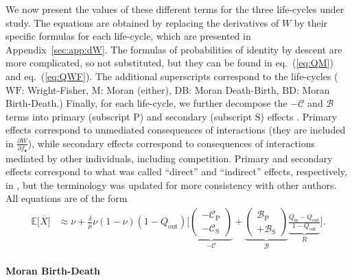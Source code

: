 \documentclass[11pt, letterpaper]{article}
\renewcommand{\eqref}[1]{\textup{{\normalfont eq.~(\ref{#1}}\normalfont)}}
\newcommand{\derivn}[2]{\frac{\partial #1}{\partial #2}}
\newcommand{\Esp}[1]{\mathbb{E}\big[ #1\big]}%
\newcommand{\appname}[0]{Appendix}
\newcommand{\Moran}{\textrm{M}}
\newcommand{\BD}{\textrm{BD}}
\newcommand{\DB}{\textrm{DB}}
\newcommand{\WF}{\textrm{WF}}
\newcommand{\mutbias}{\nu}
\newcommand{\inn}{\textrm{in}}
\newcommand{\out}{\textrm{out}}
\newcommand{\focal}{\bullet}
\newcommand{\prim}{\textrm{P}}
\newcommand{\secd}{\textrm{S}}
\newcommand{\selstr}{\delta}
\begin{document}
We now present the values of these different terms for the three life-cycles under study. The equations are obtained by replacing the derivatives of $W$ by their specific formulas for each life-cycle, which are presented in \appname~\ref{sec:app:dW}. The formulas of  probabilities of identity by descent are more complicated, so not substituted, but they can be found in \eqref{eq:QM} and \eqref{eq:QWF}. The additional superscripts correspond to the life-cycles ($\WF$: Wright-Fisher, $\Moran$: Moran (either), $\DB$: Moran Death-Birth, $\BD$: Moran Birth-Death.) Finally, for each life-cycle, we further decompose the $-\mathcal{C}$ and $\mathcal{B}$ terms into primary (subscript $\prim$) and secondary (subscript $\secd$) effects \citep{WestGardner2010}. Primary effects correspond to unmediated consequences of interactions (they are included in $\derivn{W}{f_{\focal}}$), while secondary effects correspond to consequences of interactions mediated by other individuals, including competition. Primary and secondary effects correspond to what was called ``direct'' and ``indirect'' effects, respectively, in \citet{DebarreHD2014, Debarre2017}, but the terminology was updated for more consistency with other authors. All equations are of the form
%
\begin{equation}\label{eq:EXgeneric}
\begin{split}
\Esp{\overline{X}} & \approx \mutbias + 
\frac{\selstr}{\mu}  \mutbias (1-\mutbias) (1 - Q_{\out}) 
 \Bigg[ \underbrace{ \begin{pmatrix}
 -\mathcal{C}_{\prim} \\
 -\mathcal{C}_{\secd} 
 \end{pmatrix}
}_{-\mathcal{C}} + \underbrace{ \begin{pmatrix}
\mathcal{B}_{\prim} \\
+ \mathcal{B}_{\secd} 
\end{pmatrix}
}_{\mathcal{B}} \underbrace{\frac{Q_{\inn} - Q_{\out}}{1 - Q_{\out}}}_{R} \Bigg].
\end{split}
\end{equation}

\paragraph{Moran Birth-Death}
\end{document}
